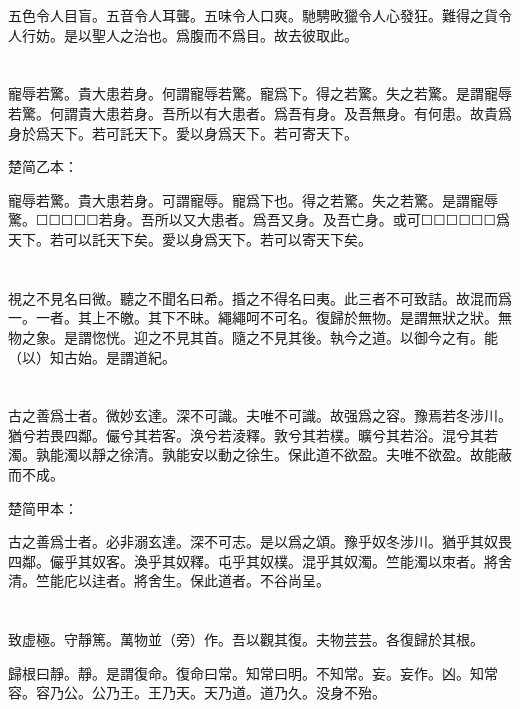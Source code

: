 \documentclass[a5paper]{ctexbook}
\begin{document}
    五色令人目盲。五音令人耳聾。五味令人口爽。馳騁畋獵令人心發狂。難得之貨令人行妨。是以聖人之治也。爲腹而不爲目。故去彼取此。

    \chapter{}

    寵辱若驚。貴大患若身。何謂寵辱若驚。寵爲下。得之若驚。失之若驚。是謂寵辱若驚。何謂貴大患若身。吾所以有大患者。爲吾有身。及吾無身。有何患。故貴爲身於爲天下。若可託天下。愛以身爲天下。若可寄天下。

    楚简乙本：

    寵辱若驚。貴大患若身。可謂寵辱。寵爲下也。得之若驚。失之若驚。是謂寵辱驚。☐☐☐☐☐若身。吾所以又大患者。爲吾又身。及吾亡身。或可☐☐☐☐☐☐爲天下。若可以託天下矣。愛以身爲天下。若可以寄天下矣。

    \chapter{}

    視之不見名曰微。聽之不聞名曰希。捪之不得名曰夷。此三者不可致詰。故混而爲一。一者。其上不皦。其下不昧。繩繩呵不可名。復歸於無物。是謂無狀之狀。無物之象。是謂惚恍。迎之不見其首。隨之不見其後。執今之道。以御今之有。能（以）知古始。是謂道紀。

    \chapter{}

    古之善爲士者。微妙玄達。深不可識。夫唯不可識。故强爲之容。豫焉若冬涉川。猶兮若畏四鄰。儼兮其若客。涣兮若淩釋。敦兮其若樸。曠兮其若浴。混兮其若濁。孰能濁以靜之徐清。孰能安以動之徐生。保此道不欲盈。夫唯不欲盈。故能蔽而不成。

    楚简甲本：

    古之善爲士者。必非溺玄達。深不可志。是以爲之頌。豫乎奴冬涉川。猶乎其奴畏四鄰。儼乎其奴客。渙乎其奴釋。屯乎其奴樸。混乎其奴濁。竺能濁以朿者。將舍清。竺能庀以迬者。將舍生。保此道者。不谷尚呈。

    \chapter{}

    致虚極。守靜篤。萬物並（旁）作。吾以觀其復。夫物芸芸。各復歸於其根。
    
    歸根曰靜。靜。是謂復命。復命曰常。知常曰明。不知常。妄。妄作。凶。知常容。容乃公。公乃王。王乃天。天乃道。道乃久。没身不殆。
\end{document}
